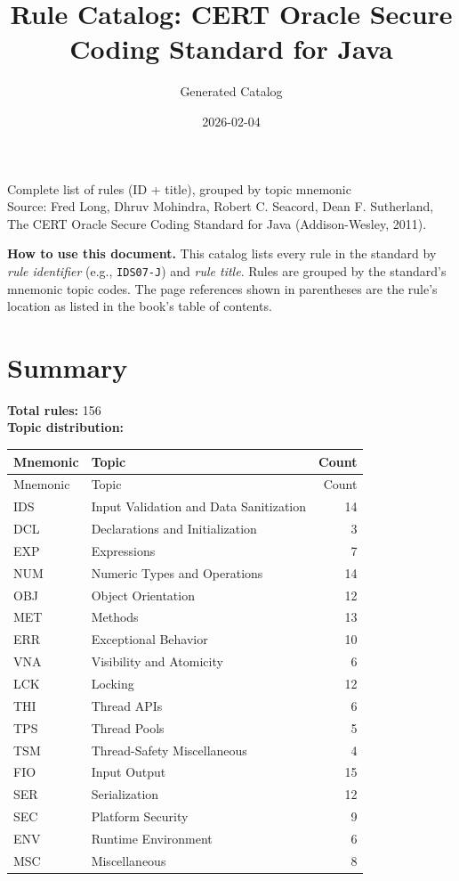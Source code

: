 \documentclass[11pt]{report}
\title{Rule Catalog: CERT Oracle Secure Coding Standard for Java}
\author{Generated Catalog}
\date{2026-02-04}
\begin{document}
\maketitle
\thispagestyle{empty}
\begin{center}
\large Complete list of rules (ID + title), grouped by topic mnemonic\\[6pt]
\normalsize Source: Fred Long, Dhruv Mohindra, Robert C. Seacord, Dean F. Sutherland, The CERT\textregistered{} Oracle\textregistered{} Secure Coding Standard for Java\texttrademark{} (Addison-Wesley, 2011).\\
\end{center}
\vspace{12pt}
\noindent\textbf{How to use this document.} This catalog lists every rule in the standard by \emph{rule identifier} (e.g., \texttt{IDS07-J}) and \emph{rule title}. Rules are grouped by the standard's mnemonic topic codes. The page references shown in parentheses are the rule's location as listed in the book's table of contents.
\tableofcontents
\clearpage
\chapter*{Summary}
\noindent\textbf{Total rules:} 156\\
\noindent\textbf{Topic distribution:}
\begin{longtable}{@{}llr@{}}
\toprule
Mnemonic & Topic & Count\\
\midrule
\endfirsthead
\toprule
Mnemonic & Topic & Count\\
\midrule
\endhead
\bottomrule
\endfoot
IDS & Input Validation and Data Sanitization & 14\\
DCL & Declarations and Initialization & 3\\
EXP & Expressions & 7\\
NUM & Numeric Types and Operations & 14\\
OBJ & Object Orientation & 12\\
MET & Methods & 13\\
ERR & Exceptional Behavior & 10\\
VNA & Visibility and Atomicity & 6\\
LCK & Locking & 12\\
THI & Thread APIs & 6\\
TPS & Thread Pools & 5\\
TSM & Thread-Safety Miscellaneous & 4\\
FIO & Input Output & 15\\
SER & Serialization & 12\\
SEC & Platform Security & 9\\
ENV & Runtime Environment & 6\\
MSC & Miscellaneous & 8\\
\end{longtable}
\clearpage
\end{document}
